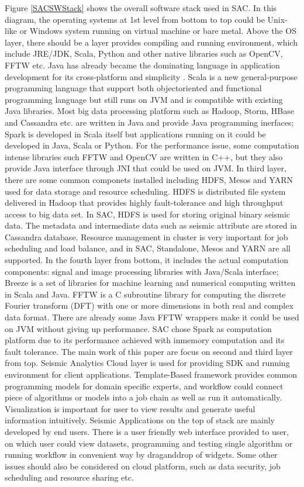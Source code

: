 Figure \ref{SACSWStack} shows the overall software stack used in SAC. In this diagram, the operating systems at 1st level from bottom to top could be Unix-like or Windows system running on virtual machine or bare metal. Above the OS layer, there should be a layer provides compiling and running environment, which include JRE/JDK, Scala, Python and other native libraries such as OpenCV, FFTW etc. Java has already became the dominating language in application development for its cross-platform and simplicity \cite{Top10Lang}. Scala is a new general-purpose programming language that support both object\-oriented and functional programming language but still runs on JVM and is compatible with existing Java libraries. Most big data processing platform such as Hadoop, Storm, HBase and Cassandra etc. are written in Java and provide Java programming inerfaces; Spark is developed in Scala itself but applications running on it could be developed in Java, Scala or Python. For the performance issue, some computation intense libraries such FFTW and OpenCV are written in C++, but they also provide Java interface through JNI that could be used on JVM. In third layer, there are some common componets installed including HDFS, Mesos \cite{ApacheMesos} and YARN \cite{ApacheHadoop}  used for data storage and resource scheduling. HDFS is distributed file system delivered in Hadoop that provides highly fault-tolerance and high throughput access to big data set. In SAC, HDFS is used for storing original binary seismic data. The metadata and intermediate data such as seismic attribute are stored in Cassandra database. Resource management in cluster is very important for job scheduling and load balance, and in SAC, Standalone, Mesos and YARN are all supported. In the fourth layer from bottom, it includes the actual computation components: signal and image processing libraries with Java/Scala interface; Breeze \cite{ScalaNLPBreeze} is a set of libraries for machine learning and numerical computing written in Scala and Java. FFTW \cite{Frigo05thedesign} is a C subroutine library for computing the discrete Fourier transform (DFT) with one or more dimensions in both real and complex data format. There are already some Java FFTW wrappers make it could be used on JVM without giving up performance. SAC chose Spark as computation platform due to its performance achieved with in\-memory computation and its fault tolerance. The main work of this paper are focus on second and third layer from top. Seismic Analytics Cloud layer is used for providing SDK and running environment for client applications. Template-Based framework provides common programming models for domain specific experts, and workflow could connect piece of algorithms or models into a job chain as well as run it automatically. Visualization is important for user to view results and generate useful information intuitively. Seismic Applications on the top of stack are mainly developed by end users. There is a user friendly web interface provided to user, on which user could view datasets, programming and testing single algorithm or running workflow in convenient way by drag\-and\-drop of widgets. Some other issues should also be considered on cloud platform, such as data security, job scheduling and resource sharing etc.   

